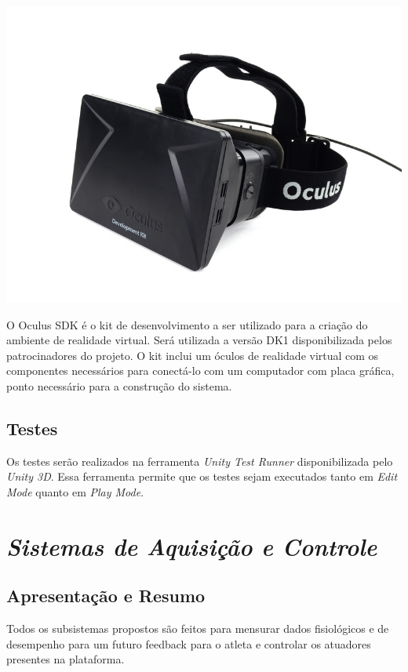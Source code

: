 \begin{center}
	\includegraphics[scale=0.4]{figuras/Oculos_sdk}
\end{center} 

O Oculus SDK é o kit de desenvolvimento a ser utilizado para a criação do ambiente de realidade virtual. Será utilizada a versão DK1 disponibilizada
pelos patrocinadores do projeto. O kit inclui um óculos de realidade virtual com os componentes necessários para conectá-lo com um computador com placa gráfica, ponto necessário para a construção do sistema.

\subsection{Testes}

Os testes serão realizados na ferramenta \textit{Unity Test Runner} disponibilizada pelo \textit{Unity 3D}. Essa ferramenta permite que os testes sejam executados tanto em \textit{Edit Mode} quanto em \textit{Play Mode}.

\section{\textit{Sistemas de Aquisição e Controle}}

\subsection{Apresentação e Resumo}
Todos os subsistemas propostos são feitos para mensurar dados fisiológicos e de desempenho para um futuro feedback para o atleta e controlar os atuadores presentes na plataforma.

